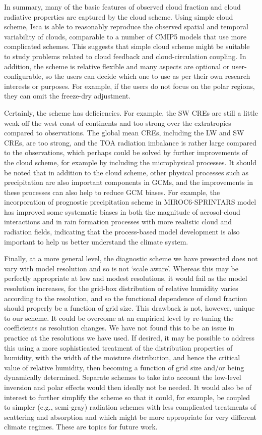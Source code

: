 In summary, many of the basic features of observed cloud fraction and cloud radiative properties are captured by the cloud scheme. Using simple cloud scheme, Isca is able to reasonably reproduce the observed spatial and temporal variability of clouds, comparable to a number of CMIP5 models that use more complicated schemes. This suggests that simple cloud scheme might be suitable to study problems related to cloud feedback and cloud-circulation coupling. In addition, the scheme is relative flexible and many aspects are optional or user-configurable, so the users can decide which one to use as per their own research interests or purposes. For example, if the users do not focus on the polar regions, they can omit the freeze-dry adjustment. 

Certainly, the scheme has deficiencies. For example, the SW CREs are still a little weak off the west coast of continents and too strong over the extratropics compared to observations. The global mean CREs, including the LW and SW CREs, are too strong, and the TOA radiation imbalance is rather large compared to the observations, which perhaps could be solved by further improvements of the cloud scheme, for example by including the microphysical processes. It should be noted that in addition to the cloud scheme, other physical processes such as precipitation are also important components in GCMs, and the improvements in these processes can also help to reduce GCM biases. For example, the incorporation of prognostic precipitation scheme in MIROC6-SPRINTARS model \citep{Michibata2019} has improved some systematic biases in both the magnitude of aerosol-cloud interactions and in rain formation processes with more realistic cloud and radiation fields, indicating that the process-based model development is also important to help us better understand the climate system.

Finally, at a more general level, the diagnostic scheme we have presented does not vary with model resolution and so is not `scale aware'. Whereas this may be perfectly appropriate at low and modest resolutions, it would fail as the model resolution increases, for the grid-box distribution of relative humidity varies according to the resolution, and so the functional dependence of cloud fraction should properly be a function of grid size. This drawback is not, however, unique to our scheme. It could be overcome at an empirical level by re-tuning the coefficients as resolution changes. We have not found this to be an issue in practice at the resolutions we have used. If desired, it may be possible to address this using a more sophisticated treatment of the distribution properties of humidity, with the width of the moisture distribution, and hence the critical value of relative humidity, then becoming a function of grid size and/or being dynamically determined. Separate schemes to take into account the low-level inversion and polar effects would then ideally not be needed. It would also be of interest to further simplify the scheme so that it could, for example, be coupled to simpler (e.g., semi-gray) radiation schemes with less complicated treatments of scattering and absorption and which might be more appropriate for very different climate regimes. These are topics for future work. 